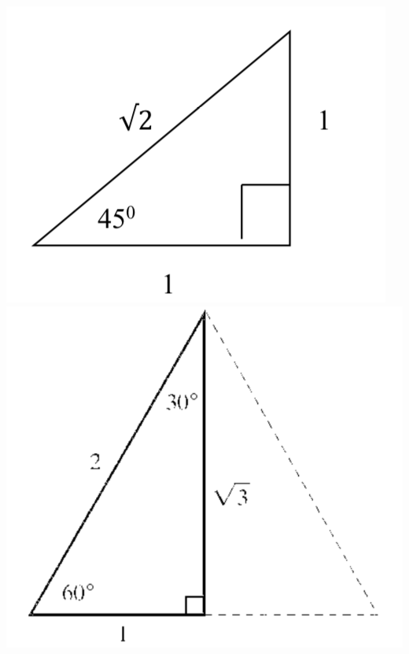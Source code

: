 \begin{enumerate}
\includegraphics{trigex2}\\
\includegraphics[scale=.7]{trigex3}\vfill



\end{enumerate}
